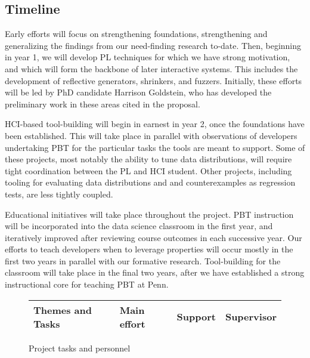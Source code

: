 \subsection*{Timeline}


\iflater
{}

Early efforts will focus on strengthening foundations, strengthening and
generalizing the findings from our need-finding research to-date. Then, beginning in
year 1, we will develop PL techniques for which we have strong
motivation, and which will form the backbone of later interactive systems. This
includes the development of reflective generators, shrinkers, and fuzzers.
Initially, these efforts will be led by PhD candidate Harrison Goldstein, who
has developed the preliminary work in these areas cited in the proposal.

HCI-based tool-building will begin in earnest in year 2, once the
foundations have been established. This will take place in parallel with observations
of developers undertaking PBT for the particular tasks the tools are meant to
support. Some of these projects, most notably the ability to tune data
distributions, will require tight coordination between the PL and HCI student.
Other projects, including tooling for evaluating data distributions and and
counterexamples as regression tests, are less tightly coupled.

Educational initiatives will take place throughout the project. PBT
instruction will be incorporated into the data science classroom in the
first year, and iteratively improved after reviewing course outcomes in each
successive year. Our efforts to teach developers when to leverage properties will
occur mostly in the first two years in parallel with our formative
research. Tool-building for the classroom will take place in the final two
years, after we have established a strong instructional core for teaching PBT at
Penn.
\fi



\renewcommand{\tasksection}{\tasksectionroles}
\begin{figure}[h]
\centering
\begin{tabular}[c]{@{}llll}
  {\bf Themes and Tasks} & {\bf Main effort} & {\bf Support}
  & {\bf Supervisor}
\\
  \hline
  
\end{tabular}
\caption{Project tasks and personnel \iflater{}\fi
  \iflater{}\fi}
\label{fig:roles}
\end{figure}

